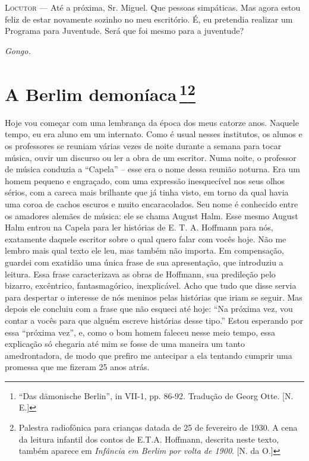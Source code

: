 \textsc{Locutor} --- Até a próxima, Sr. Miguel. Que pessoas simpáticas. Mas agora
estou feliz de estar novamente sozinho no meu escritório. É, eu
pretendia realizar um Programa para Juventude. Será que foi mesmo para a
juventude?

\emph{Gongo.}

\chapter{A Berlim demoníaca\,\footnote{``Das dämonische Berlin'', in 
  VII-1, pp. 86-92. Tradução de Georg Otte. [N. E.]}\footnote{Palestra
  radiofônica para crianças datada de 25 de fevereiro de 1930. A cena da
  leitura infantil dos contos de E.T.A. Hoffmann, descrita neste texto,
  também aparece em \emph{Infância em Berlim por volta de 1900}. [N.
  da O.]} }

Hoje vou começar com uma lembrança da época dos meus catorze anos.
Naquele tempo, eu era aluno em um internato. Como é usual nesses
institutos, os alunos e os professores se reuniam várias vezes de noite
durante a semana para tocar música, ouvir um discurso ou ler a obra de
um escritor. Numa noite, o professor de música conduzia a ``Capela'' --
esse era o nome dessa reunião noturna. Era um homem pequeno e engraçado,
com uma expressão inesquecível nos seus olhos sérios, com a careca mais
brilhante que já tinha visto, em torno da qual havia uma coroa de cachos
escuros e muito encaracolados. Seu nome é conhecido entre os amadores
alemães de música: ele se chama August Halm. Esse mesmo August Halm
entrou na Capela para ler histórias de E. T. A. Hoffmann para nós,
exatamente daquele escritor sobre o qual quero falar com vocês hoje. Não
me lembro mais qual texto ele leu, mas também não importa. Em
compensação, guardei com exatidão uma única frase de sua apresentação,
que introduziu a leitura. Essa frase caracterizava as obras de Hoffmann,
sua predileção pelo bizarro, excêntrico, fantasmagórico, inexplicável.
Acho que tudo que disse servia para despertar o interesse de nós meninos
pelas histórias que iriam se seguir. Mas depois ele concluiu com a frase
que não esqueci até hoje: ``Na próxima vez, vou contar a vocês para que
alguém escreve histórias desse tipo.'' Estou esperando por essa
``próxima vez'', e, como o bom homem faleceu nesse meio tempo, essa
explicação só chegaria até mim se fosse de uma maneira um tanto
amedrontadora, de modo que prefiro me antecipar a ela tentando cumprir
uma promessa que me fizeram 25 anos atrás.

